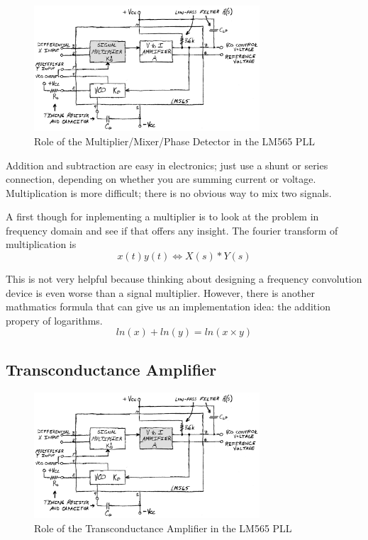 \documentclass[titlepage, letterpaper, 10.5pt]{article}
\begin{document}
\begin{figure}[ht]
	\centering
	\includegraphics[width=0.75\textwidth]{diagrams/565-block-diagram-signal-multiplier}
	\caption{Role of the Multiplier/Mixer/Phase Detector in the LM565 PLL}
	\label{565-block-diagram-signal-multiplier}
\end{figure}


Addition and subtraction are easy in electronics; just use a shunt or series connection, depending on whether you are summing current or voltage.
Multiplication is more difficult; there is no obvious way to mix two signals.

A first though for inplementing a multiplier is to look at the problem in frequency domain and see if that offers any insight.
The fourier transform of multiplication is
\begin{equation*}
x(t)y(t) \Longleftrightarrow X(s)*Y(s)
\end{equation*}

This is not very helpful because thinking about designing a frequency convolution device is even worse than a signal multiplier.
However, there is another mathmatics formula that can give us an implementation idea: the addition propery of logarithms.
\begin{equation}
ln(x)+ln(y)=ln(x\times y)
\label{log-eq}
\end{equation}

\clearpage
\subsection{Transconductance Amplifier}

\begin{figure}[ht]
	\centering
	\includegraphics[width=0.75\textwidth]{diagrams/565-block-diagram-i-to-v-amplifier}
	\caption{Role of the Transconductance Amplifier in the LM565 PLL}
	\label{565-block-diagram-i-to-v-amplifier}
\end{figure}
\end{document}
